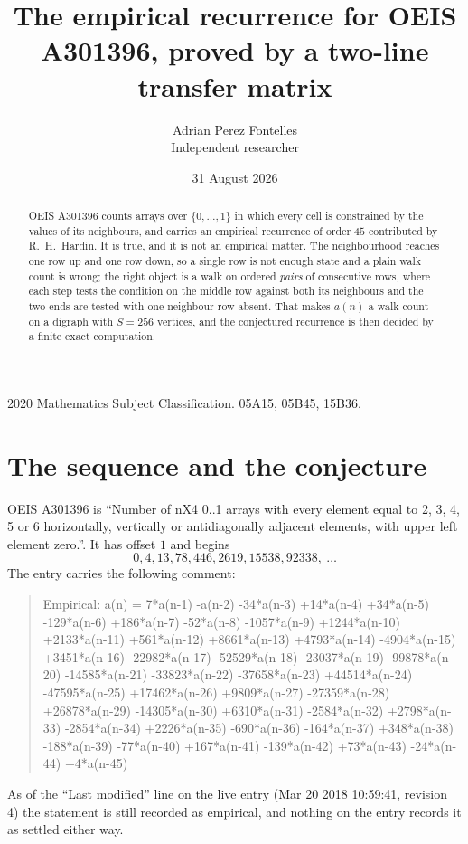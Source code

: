 \documentclass[11pt,a4paper]{article}
\title{The empirical recurrence for OEIS A301396, proved by a two-line transfer matrix}
\author{Adrian Perez Fontelles\\ \small Independent researcher}
\date{31 August 2026}
\theoremstyle{plain}
\theoremstyle{definition}
\begin{document}
\maketitle

\begin{abstract}
OEIS A301396 counts arrays over $\{0,\dots,1\}$ in which every cell is constrained by the
values of its neighbours, and carries an empirical recurrence of order $45$ contributed
by R.~H.~Hardin. It is true, and it is not an empirical matter. The neighbourhood reaches one
row up and one row down, so a single row is not enough state and a plain walk count
is wrong; the right object is a walk on ordered \emph{pairs} of consecutive rows, where
each step tests the condition on the middle row against both its neighbours and the two
ends are tested with one neighbour row absent. That makes $a(n)$ a walk count on a digraph
with $S=256$ vertices, and the conjectured recurrence is then decided by a finite exact
computation.
\end{abstract}

\noindent\small 2020 Mathematics Subject Classification. 05A15, 05B45, 15B36.\normalsize

\section{The sequence and the conjecture}

OEIS A301396 is ``Number of nX4 0..1 arrays with every element equal to 2, 3, 4, 5 or 6 horizontally, vertically or antidiagonally adjacent elements, with upper left element zero.''. It has offset $1$ and begins
\[
0, 4, 13, 78, 446, 2619, 15538, 92338,\ \dots
\]
The entry carries the following comment:
\begin{quote}\small
Empirical: a(n) = 7*a(n-1) -a(n-2) -34*a(n-3) +14*a(n-4) +34*a(n-5) -129*a(n-6) +186*a(n-7) -52*a(n-8) -1057*a(n-9) +1244*a(n-10) +2133*a(n-11) +561*a(n-12) +8661*a(n-13) +4793*a(n-14) -4904*a(n-15) +3451*a(n-16) -22982*a(n-17) -52529*a(n-18) -23037*a(n-19) -99878*a(n-20) -14585*a(n-21) -33823*a(n-22) -37658*a(n-23) +44514*a(n-24) -47595*a(n-25) +17462*a(n-26) +9809*a(n-27) -27359*a(n-28) +26878*a(n-29) -14305*a(n-30) +6310*a(n-31) -2584*a(n-32) +2798*a(n-33) -2854*a(n-34) +2226*a(n-35) -690*a(n-36) -164*a(n-37) +348*a(n-38) -188*a(n-39) -77*a(n-40) +167*a(n-41) -139*a(n-42) +73*a(n-43) -24*a(n-44) +4*a(n-45)
\end{quote}
As of the ``Last modified'' line on the live entry (Mar 20 2018 10:59:41, revision 4) the statement is
still recorded as empirical, and nothing on the entry records it as settled either way.
\end{document}

